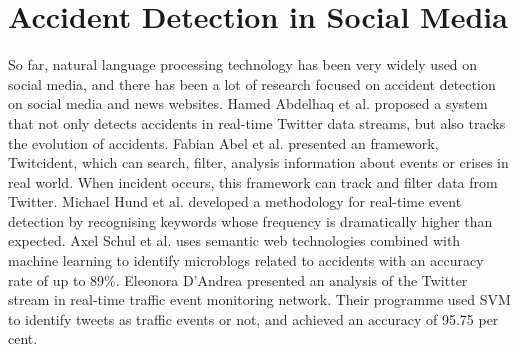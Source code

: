 \section{Accident Detection in Social Media}
\qquad So far, natural language processing technology has been very widely used on social media, and there has been a lot of research focused on accident detection on social media and news websites. Hamed Abdelhaq et al. \cite{abdelhaq2013eventweet} proposed a system that not only detects accidents in real-time Twitter data streams, but also tracks the evolution of accidents. Fabian Abel et al. \cite{abel2012twitcident} presented an framework, Twitcident, which can search, filter, analysis information about events or crises in real world. When incident occurs, this framework can track and filter data from Twitter. Michael Hund et al.%
developed a methodology for real-time event detection by recognising keywords whose frequency is dramatically higher than expected. Axel Schul et al.\cite{schulz2013see} uses semantic web technologies combined with machine learning to identify microblogs related to accidents with an accuracy rate of up to 89\%. Eleonora D'Andrea \cite{d2015real} presented an analysis of the Twitter stream in real-time traffic event monitoring network. Their programme used SVM to identify tweets as traffic events or not, and achieved an accuracy of 95.75 per cent. 


